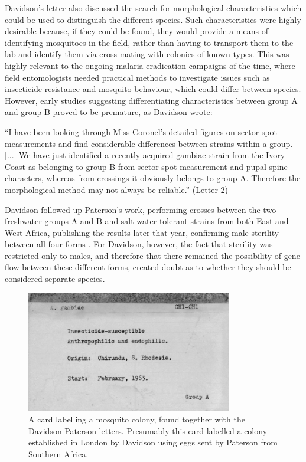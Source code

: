 \documentclass[a4paper,11pt,abstracton,hidelinks]{scrartcl}
\begin{document}
Davidson's letter also discussed the search for morphological characteristics which could be used to distinguish the different species.
%
Such characteristics were highly desirable because, if they could be found, they would provide a means of identifying mosquitoes in the field, rather than having to transport them to the lab and identify them via cross-mating with colonies of known types.
%
This was highly relevant to the ongoing malaria eradication campaigns of the time, where field entomologists needed practical methods to investigate issues such as insecticide resistance and mosquito behaviour, which could differ between species.
%
However, early studies suggesting differentiating characteristics between group A and group B \citep{Coronel1962} proved to be premature, as Davidson wrote:
\begin{displayquote}
``I have been looking through Miss Coronel's detailed figures on sector spot measurements and find considerable differences between strains within a group.
%
[...] We have just identified a recently acquired gambiae strain from the Ivory Coast as belonging to group B from sector spot measurement and pupal spine characters, whereas from crossings it obviously belongs to group A.
%
Therefore the morphological method may not always be reliable.'' (Letter 2)
\end{displayquote}


Davidson followed up Paterson's work, performing crosses between the two freshwater groups A and B and salt-water tolerant strains from both East and West Africa, publishing the results later that year, confirming male sterility between all four forms \citep{Davidson1962b}.
%
For Davidson, however, the fact that sterility was restricted only to males, and therefore that there remained the possibility of gene flow between these different forms, created doubt as to whether they should be considered separate species.


\begin{figure}[t]
\centering
\includegraphics[width=0.8\textwidth]{davidson-letters/Cards-colonies.pdf}
\caption{A card labelling a mosquito colony, found together with the Davidson-Paterson letters. Presumably this card labelled a colony established in London by Davidson using eggs sent by Paterson from Southern Africa.}
\end{figure}
\end{document}

